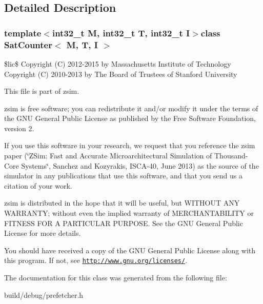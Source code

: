 \subsection{Detailed Description}
\subsubsection*{template$<$int32\-\_\-t M, int32\-\_\-t T, int32\-\_\-t I$>$class Sat\-Counter$<$ M, T, I $>$}

\$lic\$ Copyright (C) 2012-\/2015 by Massachusetts Institute of Technology Copyright (C) 2010-\/2013 by The Board of Trustees of Stanford University

This file is part of zsim.

zsim is free software; you can redistribute it and/or modify it under the terms of the G\-N\-U General Public License as published by the Free Software Foundation, version 2.

If you use this software in your research, we request that you reference the zsim paper (\char`\"{}\-Z\-Sim\-: Fast and Accurate Microarchitectural Simulation of
\-Thousand-\/\-Core Systems\char`\"{}, Sanchez and Kozyrakis, I\-S\-C\-A-\/40, June 2013) as the source of the simulator in any publications that use this software, and that you send us a citation of your work.

zsim is distributed in the hope that it will be useful, but W\-I\-T\-H\-O\-U\-T A\-N\-Y W\-A\-R\-R\-A\-N\-T\-Y; without even the implied warranty of M\-E\-R\-C\-H\-A\-N\-T\-A\-B\-I\-L\-I\-T\-Y or F\-I\-T\-N\-E\-S\-S F\-O\-R A P\-A\-R\-T\-I\-C\-U\-L\-A\-R P\-U\-R\-P\-O\-S\-E. See the G\-N\-U General Public License for more details.

You should have received a copy of the G\-N\-U General Public License along with this program. If not, see \href{http://www.gnu.org/licenses/}{\tt http\-://www.\-gnu.\-org/licenses/}. 

The documentation for this class was generated from the following file\-:\begin{DoxyCompactItemize}
\item 
build/debug/prefetcher.\-h\end{DoxyCompactItemize}
